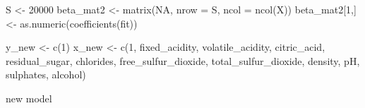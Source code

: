 \documentclass[
]{article}
\newenvironment{Shaded}{\begin{snugshade}}{\end{snugshade}}
\newcommand{\AttributeTok}[1]{\textcolor[rgb]{0.77,0.63,0.00}{#1}}
\newcommand{\ConstantTok}[1]{\textcolor[rgb]{0.00,0.00,0.00}{#1}}
\newcommand{\DecValTok}[1]{\textcolor[rgb]{0.00,0.00,0.81}{#1}}
\newcommand{\FunctionTok}[1]{\textcolor[rgb]{0.00,0.00,0.00}{#1}}
\newcommand{\NormalTok}[1]{#1}
\newcommand{\OtherTok}[1]{\textcolor[rgb]{0.56,0.35,0.01}{#1}}
\begin{document}
\begin{Shaded}
\begin{Highlighting}[]
\NormalTok{S }\OtherTok{\textless{}{-}} \DecValTok{20000}
\NormalTok{beta\_mat2 }\OtherTok{\textless{}{-}} \FunctionTok{matrix}\NormalTok{(}\ConstantTok{NA}\NormalTok{, }\AttributeTok{nrow =}\NormalTok{ S, }\AttributeTok{ncol =} \FunctionTok{ncol}\NormalTok{(X))}
\NormalTok{beta\_mat2[}\DecValTok{1}\NormalTok{,] }\OtherTok{\textless{}{-}} \FunctionTok{as.numeric}\NormalTok{(}\FunctionTok{coefficients}\NormalTok{(fit))}

\NormalTok{y\_new }\OtherTok{\textless{}{-}} \FunctionTok{c}\NormalTok{(}\DecValTok{1}\NormalTok{)}
\NormalTok{x\_new }\OtherTok{\textless{}{-}} \FunctionTok{c}\NormalTok{(}\DecValTok{1}\NormalTok{, fixed\_acidity, volatile\_acidity, citric\_acid, residual\_sugar,}
\NormalTok{           chlorides, free\_sulfur\_dioxide, total\_sulfur\_dioxide, density,}
\NormalTok{           pH, sulphates, alcohol)}
\end{Highlighting}
\end{Shaded}

new model
\end{document}
